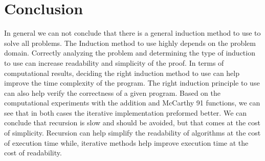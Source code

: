 \documentclass{article}
\begin{document}
\section{Conclusion}
In general we can not conclude that there is a general induction method to use to solve all problems. The Induction method to use highly depends on the problem domain. Correctly analyzing the problem and determining the type of induction to use can increase readability and simplicity of the proof. In terms of computational results, deciding the right induction method to use can help improve the time complexity of the program. The right induction principle to use can also help verify the correctness of a given program. Based on the computational experiments with the addition and McCarthy 91 functions, we can see that in both cases the iterative implementation preformed better. We can conclude that recursion is slow and should be avoided, but that comes at the cost of simplicity. Recursion can help simplify the readability of algorithms at the cost of execution time while, iterative methods help improve execution time at the cost of readability. 
\end{document}
